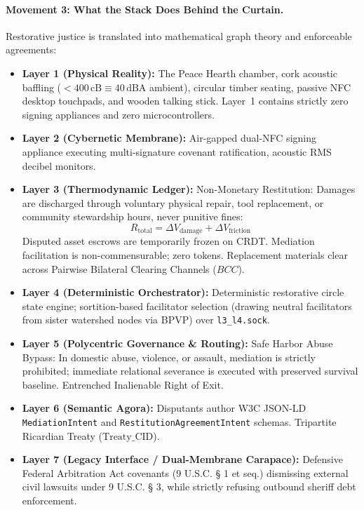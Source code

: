 \paragraph{Movement 3: What the Stack Does Behind the Curtain.}
Restorative justice is translated into mathematical graph theory and enforceable agreements:
\begin{itemize}
    \item \textbf{Layer 1 (Physical Reality):} The Peace Hearth chamber, cork acoustic baffling ($< 400\,\mathrm{cB} \equiv 40\,\mathrm{dBA}$ ambient), circular timber seating, passive NFC desktop touchpads, and wooden talking stick. Layer~1 contains strictly zero signing appliances and zero microcontrollers.
    \item \textbf{Layer 2 (Cybernetic Membrane):} Air-gapped dual-NFC signing appliance executing multi-signature covenant ratification, acoustic RMS decibel monitors.
    \item \textbf{Layer 3 (Thermodynamic Ledger):} Non-Monetary Restitution: Damages are discharged through voluntary physical repair, tool replacement, or community stewardship hours, never punitive fines:
    \[
    R_{\mathrm{total}} = \Delta V_{\mathrm{damage}} + \Delta V_{\mathrm{friction}}
    \]
    Disputed asset escrows are temporarily frozen on CRDT. Mediation facilitation is non-commensurable; zero tokens. Replacement materials clear across Pairwise Bilateral Clearing Channels ($BCC$).
    \item \textbf{Layer 4 (Deterministic Orchestrator):} Deterministic restorative circle state engine; sortition-based facilitator selection (drawing neutral facilitators from sister watershed nodes via BPVP) over \texttt{l3\_l4.sock}.
    \item \textbf{Layer 5 (Polycentric Governance \& Routing):} Safe Harbor Abuse Bypass: In domestic abuse, violence, or assault, mediation is strictly prohibited; immediate relational severance is executed with preserved survival baseline. Entrenched Inalienable Right of Exit.
    \item \textbf{Layer 6 (Semantic Agora):} Disputants author W3C JSON-LD \texttt{MediationIntent} and \texttt{RestitutionAgreementIntent} schemas. Tripartite Ricardian Treaty ($\mathrm{Treaty\_CID}$).
    \item \textbf{Layer 7 (Legacy Interface / Dual-Membrane Carapace):} Defensive Federal Arbitration Act covenants (9 U.S.C. § 1 et seq.) dismissing external civil lawsuits under 9 U.S.C. § 3, while strictly refusing outbound sheriff debt enforcement.
\end{itemize}


